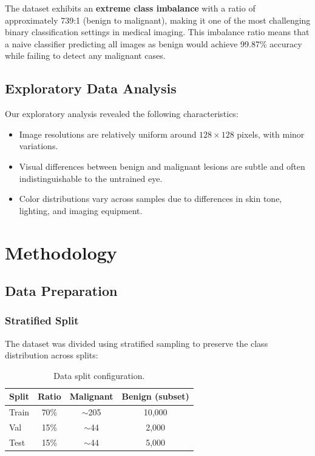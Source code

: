\documentclass[11pt, a4paper, twocolumn]{article}
\begin{document}
The dataset exhibits an \textbf{extreme class imbalance} with a ratio
of approximately 739:1 (benign to malignant), making it one of the most
challenging binary classification settings in medical imaging. This
imbalance ratio means that a naive classifier predicting all images as
benign would achieve 99.87\% accuracy while failing to detect any
malignant cases.

\subsection{Exploratory Data Analysis}

Our exploratory analysis revealed the following characteristics:

\begin{itemize}[noitemsep]
    \item Image resolutions are relatively uniform around
          $128 \times 128$ pixels, with minor variations.
    \item Visual differences between benign and malignant lesions are
          subtle and often indistinguishable to the untrained eye.
    \item Color distributions vary across samples due to differences
          in skin tone, lighting, and imaging equipment.
\end{itemize}

\section{Methodology}
\label{sec:methodology}

\subsection{Data Preparation}

\subsubsection{Stratified Split}

The dataset was divided using stratified sampling to preserve the
class distribution across splits:

\begin{table}[H]
    \centering
    \caption{Data split configuration.}
    \label{tab:splits}
    \begin{tabular}{@{}lccc@{}}
        \toprule
        \textbf{Split} & \textbf{Ratio} & \textbf{Malignant} & \textbf{Benign (subset)} \\
        \midrule
        Train & 70\% & $\sim$205 & 10,000 \\
        Val   & 15\% & $\sim$44  & 2,000 \\
        Test  & 15\% & $\sim$44  & 5,000 \\
        \bottomrule
    \end{tabular}
\end{table}
\end{document}
